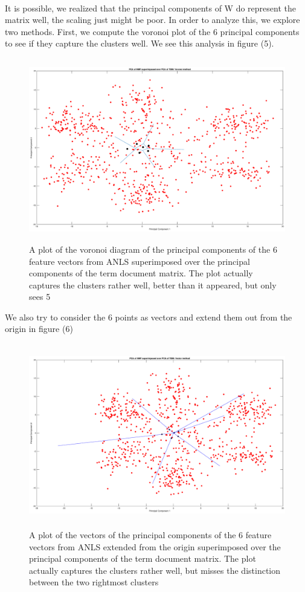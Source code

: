 \documentclass{article}
\begin{document}
\\ It is possible, we realized that the principal components of W do represent the matrix well, the scaling just might be poor. In order to analyze this, we explore two methods.  First, we compute the voronoi plot of the 6 principal components to see if they capture the clusters well.  We see this analysis in figure (5).

\begin{figure}[H]
    \centerline
    {
    \includegraphics[width=17.5cm, height=8cm]{e_voronoi}
    }
    \caption{\label{fig:my figure} A plot of the voronoi diagram of the principal components of the 6 feature vectors from ANLS superimposed over the principal components of the term document matrix.  The plot actually captures the clusters rather well, better than it appeared, but only sees 5}
\end{figure}

We also try to consider the 6 points as vectors and extend them out from the origin in figure (6)

\begin{figure}[H]
    \centerline
    {
    \includegraphics[width=17.5cm, height=8cm]{e_vector}
    }
    \caption{\label{fig:my figure} A plot of the vectors of the principal components of the 6 feature vectors from ANLS extended from the origin superimposed over the principal components of the term document matrix.  The plot actually captures the clusters rather well, but misses the distinction between the two rightmost clusters}
\end{figure}
\end{document}

